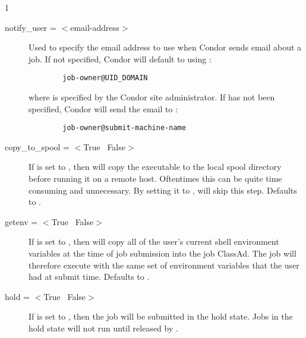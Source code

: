 \begin{ManPage}{\label{man-condor-submit}}{1}
\begin{description}

\item[notify\_user = $<$email-address$>$]\label{man-condor-submit-notify-user} Used to specify the email
address to use when Condor sends email about a job.  If not specified,
Condor will default to using :
\begin{verbatim}
        job-owner@UID_DOMAIN
\end{verbatim}
where  is specified by the Condor site administrator.  If 
 has not been specified, Condor will send the email
to :
\begin{verbatim}
        job-owner@submit-machine-name
\end{verbatim}


\item[copy\_to\_spool = $<$True \Bar\ False$>$] If  is set to
, then  will copy the executable to the local spool 
directory before running it on a remote host. Oftentimes this can be quite
time consuming and unnecessary. By setting it to , 
will skip this step.  Defaults to .


\item[getenv = $<$True \Bar\ False$>$] If  is set to
, then  will copy all of the user's current
shell environment variables at the time of job submission into the job
ClassAd. The job will therefore execute with the same set of environment
variables that the user had at submit time. Defaults to .


\item[hold = $<$True \Bar\ False$>$] If  is set to
, then the job will be submitted in the hold state.  Jobs in
the hold state will not run until released by .



\end{description}
\end{ManPage}
